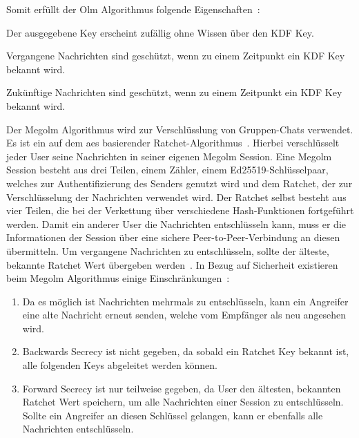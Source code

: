     Somit erfüllt der Olm Algorithmus folgende Eigenschaften~\cite{perrin2016double}:
    \begin{description}[leftmargin=!,labelwidth=3.8cm]
        \item [Resilience] Der ausgegebene Key erscheint zufällig ohne Wissen über den KDF Key.
        \item [Forward security] Vergangene Nachrichten sind geschützt, wenn zu einem Zeitpunkt ein KDF Key bekannt wird.
        \item [Break-in recovery] Zukünftige Nachrichten sind geschützt, wenn zu einem Zeitpunkt ein KDF Key bekannt wird.
    \end{description}
    \vspace{0.5cm}
    Der Megolm Algorithmus wird zur Verschlüsslung von Gruppen-Chats verwendet.
    Es ist ein auf dem \ac{aes} basierender Ratchet-Algorithmus~\cite{megolm}.
    Hierbei verschlüsselt jeder User seine Nachrichten in seiner eigenen Megolm Session.
    Eine Megolm Session besteht aus drei Teilen, einem Zähler, einem Ed25519-Schlüsselpaar, welches zur Authentifizierung
    des Senders genutzt wird und dem Ratchet, der zur Verschlüsselung der Nachrichten verwendet wird.
    Der Ratchet selbst besteht aus vier Teilen, die bei der Verkettung über verschiedene Hash-Funktionen fortgeführt werden.
    Damit ein anderer User die Nachrichten entschlüsseln kann, muss er die Informationen der Session über eine sichere Peer-to-Peer-Verbindung an diesen übermitteln.
    Um vergangene Nachrichten zu entschlüsseln, sollte der älteste, bekannte Ratchet Wert übergeben werden~\cite{megolm}.
    In Bezug auf Sicherheit existieren beim Megolm Algorithmus einige Einschränkungen~\cite{megolm}:
    \begin{enumerate}
        \item Da es möglich ist Nachrichten mehrmals zu entschlüsseln, kann ein Angreifer eine alte Nachricht erneut senden, welche vom Empfänger als neu angesehen wird.
        \item Backwards Secrecy ist nicht gegeben, da sobald ein Ratchet Key bekannt ist, alle folgenden Keys abgeleitet werden können.
        \item Forward Secrecy ist nur teilweise gegeben, da User den ältesten, bekannten Ratchet Wert speichern, um alle Nachrichten einer Session zu entschlüsseln. Sollte ein Angreifer an diesen Schlüssel gelangen, kann er ebenfalls alle Nachrichten entschlüsseln.
    \end{enumerate}
    \vspace{0.5cm}


